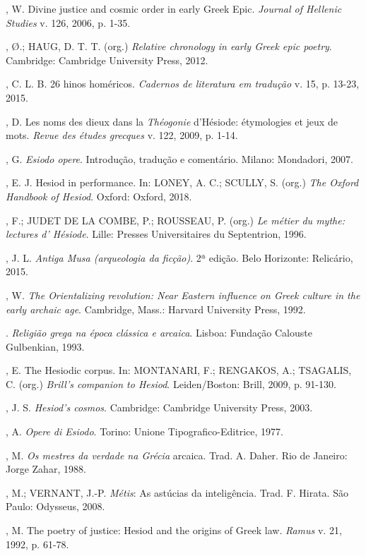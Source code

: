 \begin{bibliohedra}
, W. Divine justice and cosmic order in early Greek Epic.
\emph{Journal of Hellenic Studies} v. 126, 2006, p. 1-35.

, Ø.; HAUG, D. T. T. (org.) \emph{Relative chronology in early
Greek epic poetry}. Cambridge: Cambridge University Press, 2012.

, C. L. B. 26 hinos homéricos. \emph{Cadernos de literatura em
tradução} v. 15, p. 13-23, 2015.

, D. Les noms des dieux dans la \emph{Théogonie} d'Hésiode:
étymologies et jeux de mots. \emph{Revue des études grecques} v. 122,
2009, p. 1-14.

, G. \emph{Esiodo opere}. Introdução, tradução e comentário.
Milano: Mondadori, 2007.

, E. J. Hesiod in performance. In: LONEY, A. C.; SCULLY, S. (org.)
\emph{The Oxford Handbook of Hesiod}. Oxford: Oxford, 2018.

, F.; JUDET DE LA COMBE, P.; ROUSSEAU, P. (org.) \emph{Le métier
du mythe: lectures d' Hésiode}. Lille: Presses Universitaires du
Septentrion, 1996.

, J. L. \emph{Antiga Musa (arqueologia da ficção)}. 2ª edição.
Belo Horizonte: Relicário, 2015.

, W. \emph{The Orientalizing revolution: Near Eastern influence
on Greek culture in the early archaic age}. Cambridge, Mass.: Harvard
University Press, 1992.

\titidem. \emph{Religião grega na época clássica e arcaica}. Lisboa: Fundação
Calouste Gulbenkian, 1993.

, E. The Hesiodic corpus. In: MONTANARI, F.; RENGAKOS, A.;
TSAGALIS, C. (org.) \emph{Brill's companion to Hesiod}. Leiden/Boston:
Brill, 2009, p. 91-130.

, J. S. \emph{Hesiod's cosmos}. Cambridge: Cambridge University
Press, 2003.

, A. \emph{Opere di Esiodo}. Torino: Unione Tipografico-Editrice,
1977.

, M. \emph{Os mestres da verdade na Grécia} arcaica. Trad. A.
Daher. Rio de Janeiro: Jorge Zahar, 1988.

, M.; VERNANT, J.-P. \emph{Métis}: As astúcias da inteligência.
Trad. F. Hirata. São Paulo: Odysseus, 2008.

, M. The poetry of justice: Hesiod and the origins of Greek law.
\emph{Ramus} v. 21, 1992, p. 61-78.


\end{bibliohedra}
